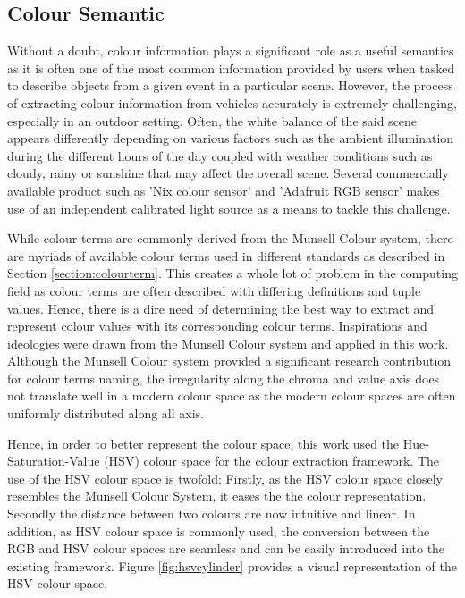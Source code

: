 \subsection{Colour Semantic}
\label{subsec:colorsemantics}

Without a doubt, colour information plays a significant role as a useful semantics as it is often one of the most common information provided by users when tasked to describe objects from a given event in a particular scene.
However, the process of extracting colour information from vehicles accurately is extremely challenging, especially in an outdoor setting. Often, the white balance of the said scene appears differently depending on various factors such as the ambient illumination during the different hours of the day coupled with weather conditions such as cloudy, rainy or sunshine that may affect the overall scene.
Several commercially available product such as 'Nix colour sensor' \cite{nixsensorltd} and 'Adafruit RGB sensor' \cite{adafruit} makes use of an independent calibrated light source as a means to tackle this challenge.

While colour terms are commonly derived from the Munsell Colour system, there are myriads of available colour terms used in different standards as described in Section \ref{section:colourterm}.
This creates a whole lot of problem in the computing field as colour terms are often described with differing definitions and tuple values.
Hence, there is a dire need of determining the best way to extract and represent colour values with its corresponding colour terms.
Inspirations and ideologies were drawn from the Munsell Colour system and applied in this work.
Although the Munsell Colour system provided a significant research contribution for colour terms naming, the irregularity along the chroma and value axis does not translate well in a modern colour space as the modern colour spaces are often uniformly distributed along all axis.

Hence, in order to better represent the colour space, this work used the Hue-Saturation-Value (HSV) colour space for the colour extraction framework.
The use of the HSV colour space is twofold: Firstly, as the HSV colour space closely resembles the Munsell Colour System, it eases the the colour representation.
Secondly the distance between two colours are now intuitive and linear.
In addition, as HSV colour space is commonly used, the conversion between the RGB and HSV colour spaces are seamless and can be easily introduced into the existing framework. Figure \ref{fig:hsvcylinder} provides a visual representation of the HSV colour space.

